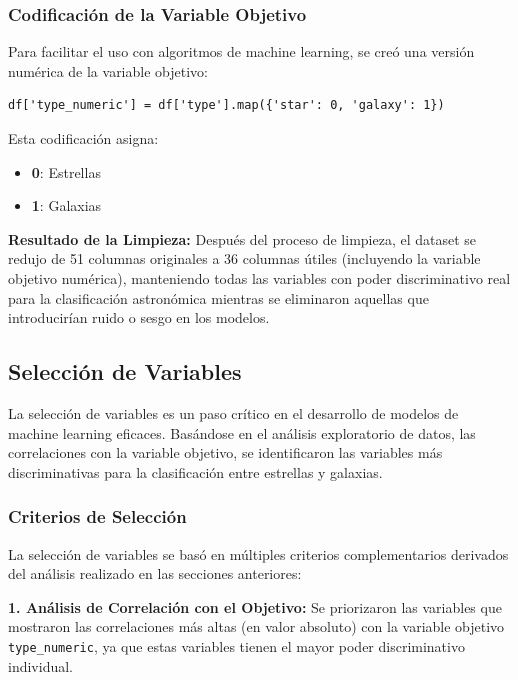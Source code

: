 \documentclass{article}
\begin{document}
\subsubsection{Codificación de la Variable Objetivo}

Para facilitar el uso con algoritmos de machine learning, se creó una versión numérica de la variable objetivo:

\begin{verbatim}
df['type_numeric'] = df['type'].map({'star': 0, 'galaxy': 1})
\end{verbatim}

Esta codificación asigna:
\begin{itemize}
    \item \textbf{0}: Estrellas
    \item \textbf{1}: Galaxias
\end{itemize}

\textbf{Resultado de la Limpieza:}
Después del proceso de limpieza, el dataset se redujo de 51 columnas originales a 36 columnas útiles (incluyendo la variable objetivo numérica), manteniendo todas las variables con poder discriminativo real para la clasificación astronómica mientras se eliminaron aquellas que introducirían ruido o sesgo en los modelos.

\subsection{Selección de Variables}

La selección de variables es un paso crítico en el desarrollo de modelos de machine learning eficaces. Basándose en el análisis exploratorio de datos, las correlaciones con la variable objetivo, se identificaron las variables más discriminativas para la clasificación entre estrellas y galaxias.

\subsubsection{Criterios de Selección}

La selección de variables se basó en múltiples criterios complementarios derivados del análisis realizado en las secciones anteriores:

\textbf{1. Análisis de Correlación con el Objetivo:}
Se priorizaron las variables que mostraron las correlaciones más altas (en valor absoluto) con la variable objetivo \texttt{type\_numeric}, ya que estas variables tienen el mayor poder discriminativo individual.
\end{document}
